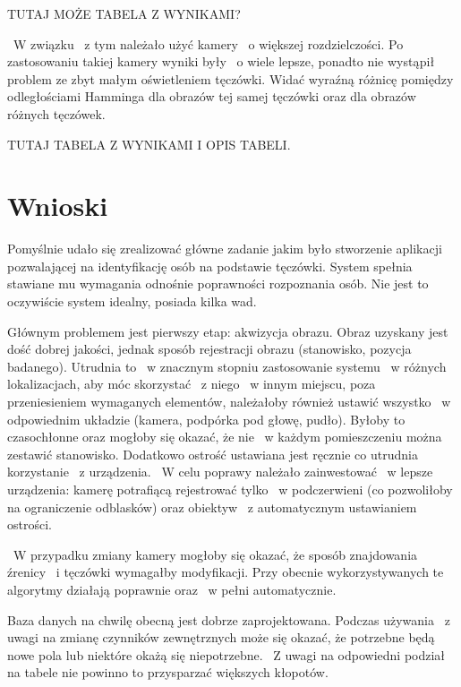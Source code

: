 TUTAJ MOŻE TABELA Z WYNIKAMI?

~W związku ~z tym należało użyć kamery ~o większej rozdzielczości. Po zastosowaniu takiej kamery wyniki były ~o wiele lepsze, ponadto nie wystąpił problem ze zbyt małym oświetleniem tęczówki. Widać wyraźną różnicę pomiędzy odległościami Hamminga dla obrazów tej samej tęczówki oraz dla obrazów różnych tęczówek.

TUTAJ TABELA Z WYNIKAMI I OPIS TABELI.

\section{Wnioski}
\label{sec:wnioski}

Pomyślnie udało się zrealizować główne zadanie jakim było stworzenie aplikacji pozwalającej na identyfikację osób na podstawie tęczówki. System spełnia stawiane mu wymagania odnośnie poprawności rozpoznania osób. Nie jest to oczywiście system idealny, posiada kilka wad.

Głównym problemem jest pierwszy etap: akwizycja obrazu. Obraz uzyskany jest dość dobrej jakości, jednak sposób rejestracji obrazu (stanowisko, pozycja badanego). Utrudnia to ~w znacznym stopniu zastosowanie systemu ~w różnych lokalizacjach, aby móc skorzystać ~z niego ~w innym miejscu, poza przeniesieniem wymaganych elementów, należałoby również ustawić wszystko ~w odpowiednim układzie (kamera, podpórka pod głowę, pudło). Byłoby to czasochłonne oraz mogłoby się okazać, że nie ~w każdym pomieszczeniu można zestawić stanowisko. Dodatkowo ostrość ustawiana jest ręcznie co utrudnia korzystanie ~z urządzenia. ~W celu poprawy należało zainwestować ~w lepsze urządzenia: kamerę potrafiącą rejestrować tylko ~w podczerwieni (co pozwoliłoby na ograniczenie odblasków) oraz obiektyw ~z automatycznym ustawianiem ostrości.

~W przypadku zmiany kamery mogłoby się okazać, że sposób znajdowania źrenicy ~i tęczówki wymagałby modyfikacji. Przy obecnie wykorzystywanych te algorytmy działają poprawnie oraz ~w pełni automatycznie.

Baza danych na chwilę obecną jest dobrze zaprojektowana. Podczas używania ~z uwagi na zmianę czynników zewnętrznych może się okazać, że potrzebne będą nowe pola lub niektóre okażą się niepotrzebne. ~Z uwagi na odpowiedni podział na tabele nie powinno to przysparzać większych kłopotów.




